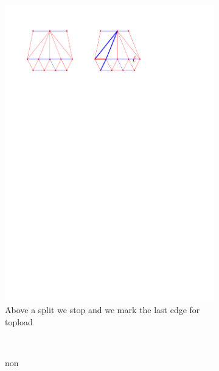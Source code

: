 \begin{figure}
    \centering
    \begin{subfigure}[b]{0.45 \textwidth}
        \includegraphics[width = \textwidth]{topFanFlips/img/split}
        \caption{Above a split we stop and we mark the last edge for topload}
    \end{subfigure}
    ~
    \begin{subfigure}[b]{0.45 \textwidth}non

\end{subfigure}
\end{figure}
